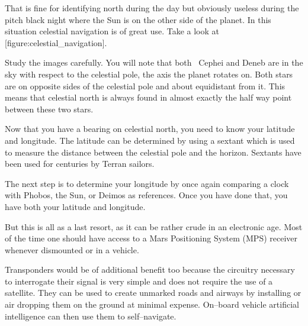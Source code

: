That is fine for identifying north during the day but obviously useless during the pitch black night where the Sun is on the other side of the planet. In this situation celestial navigation is of great use. Take a look at [figure:celestial_navigation].

\vfill
{}
    {}
    {}
    {}
    \stopcombination
\vfill

Study the images carefully. You will note that both \alpha\ Cephei and Deneb are  in the sky with respect to the celestial pole, the axis the planet rotates on. Both stars are on opposite sides of the celestial pole and about equidistant from it. This means that celestial north is always found in almost exactly the half way point between these two stars.

Now that you have a bearing on celestial north, you need to know your latitude and longitude. The latitude can be determined by using a sextant which is used to measure the distance between the celestial pole and the horizon. Sextants have been used for centuries by Terran sailors. 

The next step is to determine your longitude by once again comparing a clock with Phobos, the Sun, or Deimos as references. Once you have done that, you have both your latitude and longitude.

But this is all as a last resort, as it can be rather crude in an electronic age. Most of the time one should have access to a Mars Positioning System (MPS) receiver whenever dismounted or in a vehicle. 

Transponders would be of additional benefit too because the circuitry necessary to interrogate their signal is very simple and does not require the use of a satellite. They can be used to create unmarked roads and airways by installing or air dropping them on the ground at minimal expense. On--board vehicle artificial intelligence can then use them to self--navigate.

